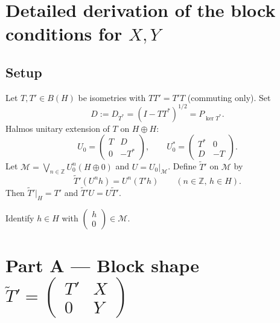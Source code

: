 \documentclass[11pt]{article}
\begin{document}
\section*{Detailed derivation of the block conditions for \(X,Y\)}

\subsection*{Setup}
Let \(T,T'\in B(H)\) be isometries with \(TT'=T'T\) (commuting only).
Set
\[
D:=D_{T^*}=(I-TT^*)^{1/2}=P_{\ker T^*}.
\]
Halmos unitary extension of \(T\) on \(H\oplus H\):
\[
U_0=\begin{pmatrix} T & D \\ 0 & -T^* \end{pmatrix},
\qquad
U_0^*=\begin{pmatrix} T^* & 0 \\ D & -T \end{pmatrix}.
\]
Let \(\mathcal{M}=\bigvee_{n\in\mathbb{Z}}U_0^n(H\oplus 0)\) and \(U=U_0\big|_{\mathcal{M}}\).
Define \(\widetilde{T}'\) on \(\mathcal{M}\) by
\begin{equation}
\label{eq:def}
\widetilde{T}'(U^n h)=U^n(T'h)\qquad(n\in\mathbb{Z},\,h\in H).
\end{equation}
Then \(\widetilde{T}'|_H=T'\) and \(\widetilde{T}'U=U\widetilde{T}'\).

Identify \(h\in H\) with \(\begin{pmatrix}h\\ 0\end{pmatrix}\in\mathcal{M}\).

\bigskip
\section*{Part A --- Block shape \(\displaystyle\widetilde{T}'=\begin{pmatrix}T'&X\\ 0&Y\end{pmatrix}\)}
\end{document}
